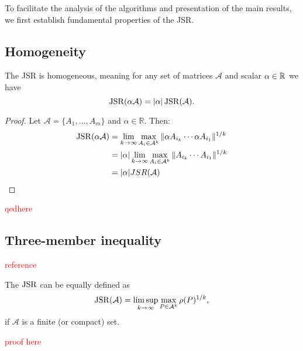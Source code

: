 To facilitate the analysis of the algorithms and presentation of the main results, we first establish fundamental properties of the JSR.

\subsection*{Homogeneity}
\begin{proposition}
    The JSR is homogeneous, meaning for any set of matrices $\mathcal{A}$ and scalar $\alpha \in \mathbb{R}$ we have
    \begin{equation}
        \operatorname{JSR}(\alpha \mathcal{A}) = |\alpha| \operatorname{JSR}(\mathcal{A}).
    \end{equation}
\end{proposition}
\begin{proof}
    Let $\mathcal{A} = \{A_1, \dots, A_m\}$ and $\alpha \in \mathbb{R}$. Then:
    \begin{align*}
        \operatorname{JSR}(\alpha \mathcal{A}) & = \lim_{k \to \infty} \max_{A_{i} \in \mathcal{A}^k} \|\alpha A_{i_k} \cdots \alpha A_{i_1}\|^{1/k} \\
        & = |\alpha| \lim_{k \to \infty} \max_{A_{i} \in \mathcal{A}^k} \|A_{i_k} \cdots A_{i_1}\|^{1/k} \\
        & = |\alpha| JSR(\mathcal{A}) \\
    \end{align*}
\end{proof}
\textcolor{red}{qedhere}

\subsection*{Three-member inequality}
\textcolor{red}{reference}
\begin{proposition}
    The $\operatorname{JSR}$ can be equally defined as
    $$
    \operatorname{JSR}(\mathcal{A}) = \limsup_{k \to \infty} \max_{P \in \mathcal{A}^k} \rho(P)^{1/k},
    $$
    if $\mathcal{A}$ is a finite (or compact) set.
\end{proposition}

\textcolor{red}{proof here}


